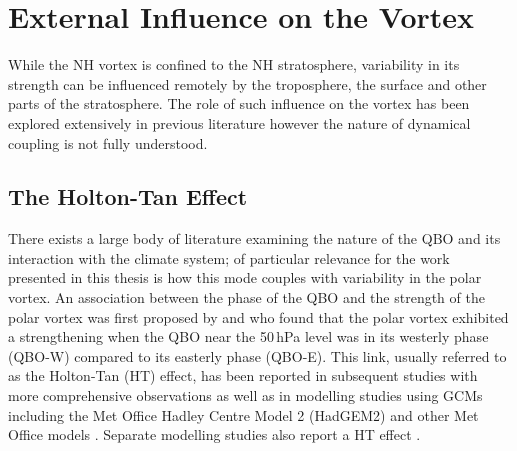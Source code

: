 \section{External Influence on the Vortex}
\label{sec:external_influence}

While the NH vortex is confined to the NH stratosphere, variability in its strength can be influenced remotely by the troposphere, the surface and other parts of the stratosphere. The role of such influence on the vortex has been explored extensively in previous literature however the nature of dynamical coupling is not fully understood. 

\subsection{The Holton-Tan Effect}
\label{sec:external_influence_HT}

There exists a large body of literature examining the nature of the QBO and its interaction with the climate system; of particular relevance for the work presented in this thesis is how this mode couples with variability in the polar vortex. An association between the phase of the QBO and the strength of the polar vortex was first proposed by \cite{HoltonJamesRTan1980} and \cite{Holton1982} who found that the polar vortex exhibited a strengthening when the QBO near the 50\,hPa level was in its westerly phase (QBO-W) compared to its easterly phase (QBO-E). This link, usually referred to as the Holton-Tan (HT) effect, has been reported in subsequent studies with more comprehensive observations as well as in modelling studies using GCMs including the Met Office Hadley Centre Model 2 (HadGEM2) \citep{Watson2014} and other Met Office models \citep{Garfinkel2018}. Separate modelling studies also report a HT effect \citep{Baldwin1991,pascoeQuasibiennial2005b,luDecadalscale2008c}.


